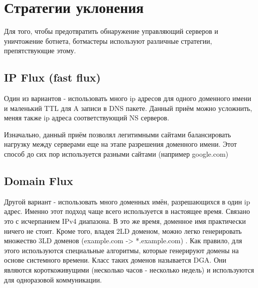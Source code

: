 \documentclass[14pt]{extreport}
\begin{document}
	
	\newpage
	\section{Стратегии уклонения}
	Для того, чтобы предотвратить обнаружение управляющий серверов и уничтожение ботнета, ботмастеры используют различные стратегии, препятствующие этому.
	\subsection{IP Flux (fast flux)}
	Один из вариантов - использовать много ip адресов для одного доменного имени и маленький TTL для A записи в DNS пакете. Данный приём можно усложнить, меняя также ip адреса соответствующий NS серверов.
	
	Изначально, данный приём позволял легитимными сайтами балансировать нагрузку между серверами еще на этапе разрешения доменного имени. Этот способ до сих пор используется разными сайтами (например google.com)
	
	\subsection{Domain Flux}
	Другой вариант - использовать много доменных имён, разрешающихся в один ip адрес. Именно этот подход чаще всего используется в настоящее время. Связано это с исчерпанием IPv4 диапазона. В это же время, доменное имя практически ничего не стоит. Кроме того, владея 2LD доменом, можно легко генерировать множество 3LD доменов (example.com -> *.example.com) .
	Как правило, для этого используются специальные алгоритмы, которые генерируют домены на основе системного времени. Класс таких доменов называется DGA. Они являются короткоживущими (несколько часов - несколько недель) и используются для одноразовой коммуникации. 
	
\end{document}
